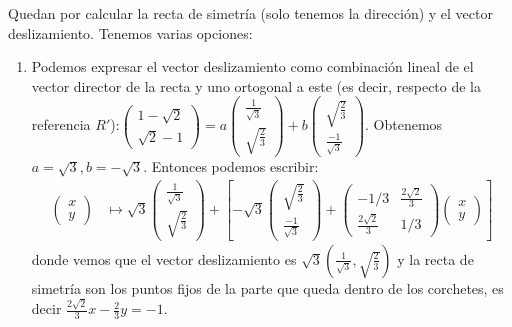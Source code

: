 \documentclass[14pt]{book}
\begin{document}
\begin{ej}
	Quedan por calcular la recta de simetría (solo tenemos la dirección) y el vector deslizamiento. Tenemos varias opciones:
	\begin{enumerate}
		\item Podemos expresar el vector deslizamiento como combinación lineal de el vector director de la recta y uno ortogonal a este (es decir, respecto de la referencia $R'$):$\left(\begin{array}{c}
		1 - \sqrt{2} \\ \sqrt{2} - 1
		\end{array}\right) = a\left(\begin{array}{c}
		\frac{1}{\sqrt{3}} \\ \sqrt{\frac{2}{3}}
		\end{array}\right) + b\left(\begin{array}{c}
		\sqrt{\frac{2}{3}} \\ \frac{-1}{\sqrt{3}}
		\end{array}\right)$. Obtenemos $a = \sqrt{3}, b = -\sqrt{3}$. Entonces podemos escribir:
		\begin{align*}
			\left(\begin{array}{c}
			x \\ y
			\end{array}\right) &\mapsto
			\sqrt{3}\left(\begin{array}{c}
			\frac{1}{\sqrt{3}} \\ \sqrt{\frac{2}{3}}
			\end{array}\right) + \left[-\sqrt{3}\left(\begin{array}{c}
			\sqrt{\frac{2}{3}} \\ \frac{-1}{\sqrt{3}}
			\end{array}\right)+\left(\begin{array}{cc}
			-1/3 & \frac{2\sqrt{2}}{3} \\
			\frac{2\sqrt{2}}{3} & 1/3
			\end{array}\right)\left(\begin{array}{c}
			x \\ y
			\end{array}\right)\right]
		\end{align*}
		donde vemos que el vector deslizamiento es $\sqrt{3}\left(
		\frac{1}{\sqrt{3}}, \sqrt{\frac{2}{3}}\right)$ y la recta de simetría son los puntos fijos de la parte que queda dentro de los corchetes, es decir $\frac{2\sqrt{2}}{3}x - \frac{2}{3}y = -1$.
		

\end{enumerate}
\end{ej}
\end{document}

